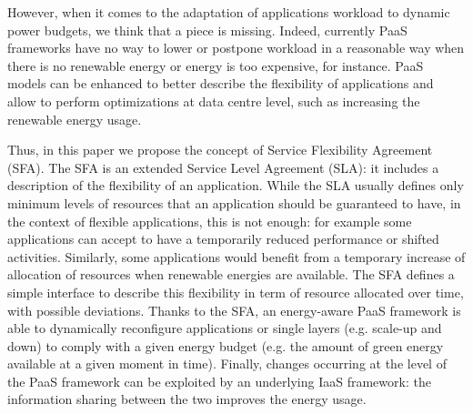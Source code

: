 However, when it comes to the adaptation of applications workload to dynamic power budgets, we think that a piece is missing.
Indeed, currently PaaS frameworks have no way to lower or postpone workload in a reasonable way when there is no renewable energy or energy is too expensive, for instance.
PaaS models can be enhanced to better describe the flexibility of applications and allow to perform optimizations at data centre level, such as increasing the renewable energy usage.

Thus, in this paper we propose the concept of Service Flexibility Agreement (SFA). 
The SFA is an extended Service Level Agreement (SLA): it includes a description of the flexibility of an application.
While the SLA usually defines only minimum levels of resources that an application should be guaranteed to have, in the context of flexible applications, this is not enough: for example some applications can accept to have a temporarily reduced performance or shifted activities.
Similarly, some applications would benefit from a temporary increase of allocation of resources when renewable energies are available.
The SFA defines a simple interface to describe this flexibility in term of resource allocated over time, with possible deviations. 
Thanks to the SFA, an energy-aware PaaS framework is able to dynamically reconfigure applications or single layers (e.g. scale-up and down) to comply with a given energy budget (e.g. the amount of green energy available at a given moment in time).
Finally, changes occurring at the level of the PaaS framework can be exploited by an underlying IaaS framework: the information sharing between the two improves the energy usage.
